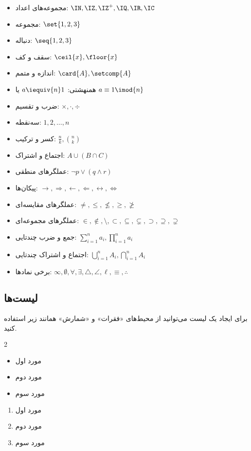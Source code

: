 \begin{itemize}
\item مجموعه‌‌های اعداد: 
$\IN, \IZ, \IZ^+, \IQ, \IR, \IC$
\item مجموعه:
$\set{1, 2, 3}$
\item دنباله‌:
$\seq{1, 2, 3}$
\item سقف و کف:
$\ceil{x}, \floor{x}$
\item اندازه و متمم:
$\card{A}, \setcomp{A}$
\item همنهشتی:
$a \iequiv{n} 1$
یا
$a \equiv 1 \imod{n}$ 
\item ضرب و تقسیم:
$\times, \cdot, \div$
\item سه‌نقطه‌:
$1, 2, \dots, n$
\item کسر و ترکیب:
$\frac{n}{k}, \binom{n}{k}$
\item اجتماع و اشتراک:
$A \cup (B \cap C)$
\item عملگرهای منطقی:
$\neg p \vee (q \wedge r)$

\item پیکان‌ها:
$\rightarrow, \Rightarrow, \leftarrow, \Leftarrow, \leftrightarrow, \Leftrightarrow$
\item عملگرهای مقایسه‌ای:
$\not=, \le, \not\le, \ge, \not\ge$
\item عملگرهای مجموعه‌ای:
$\in, \not\in, \setminus, \subset, \subseteq, \subsetneq, \supset, \supseteq, \supsetneq$

\item جمع و ضرب چندتایی:
$\sum_{i=1}^{n} a_i, \prod_{i=1}^{n} a_i$
\item اجتماع و اشتراک چندتایی:
$\bigcup_{i=1}^{n} A_i, \bigcap_{i=1}^{n} A_i$
\item برخی نمادها:
$\infty, \emptyset, \forall, \exists, \triangle, \angle, \ell, \equiv, \therefore$
\end{itemize}


\subsection{لیست‌ها}

برای ایجاد یک لیست‌ می‌توانید از محیط‌های «فقرات» و «شمارش» همانند زیر استفاده کنید.

\begin{multicols}{2}
\begin{itemize}
\item مورد اول
\item مورد دوم
\item مورد سوم
\end{itemize}

\begin{enumerate}
\item مورد اول
\item مورد دوم
\item مورد سوم
\end{enumerate}

\end{multicols}


